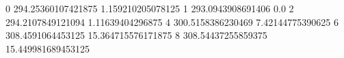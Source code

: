 0 294.25360107421875 1.159210205078125
1 293.0943908691406 0.0
2 294.2107849121094 1.11639404296875
4 300.5158386230469 7.42144775390625
6 308.4591064453125 15.364715576171875
8 308.54437255859375 15.449981689453125
